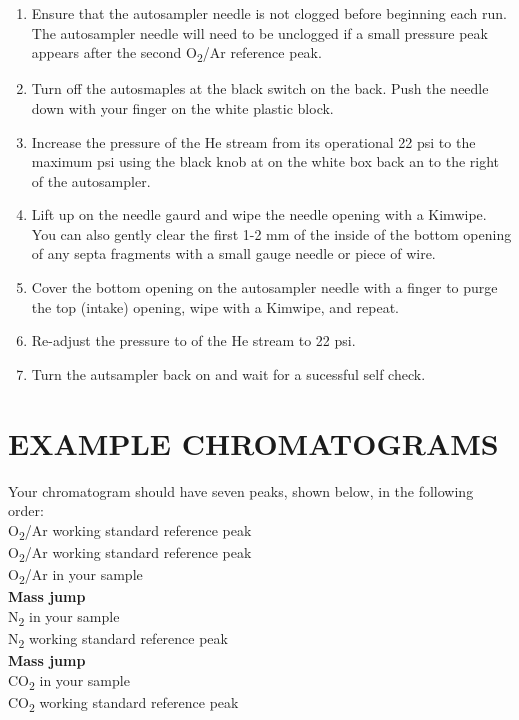 \documentclass[]{article}
\providecommand{\tightlist}{%
  \setlength{\itemsep}{0pt}\setlength{\parskip}{0pt}}
\begin{document}
\begin{enumerate}
\def\labelenumi{\arabic{enumi}.}
\tightlist
\item
  Ensure that the autosampler needle is not clogged before beginning
  each run. The autosampler needle will need to be unclogged if a small
  pressure peak appears after the second O\textsubscript{2}/Ar reference
  peak.\\
\item
  Turn off the autosmaples at the black switch on the back. Push the
  needle down with your finger on the white plastic block.\\
\item
  Increase the pressure of the He stream from its operational 22 psi to
  the maximum psi using the black knob at on the white box back an to
  the right of the autosampler.\\
\item
  Lift up on the needle gaurd and wipe the needle opening with a
  Kimwipe. You can also gently clear the first 1-2 mm of the inside of
  the bottom opening of any septa fragments with a small gauge needle or
  piece of wire.\\
\item
  Cover the bottom opening on the autosampler needle with a finger to
  purge the top (intake) opening, wipe with a Kimwipe, and repeat.\\
\item
  Re-adjust the pressure to of the He stream to 22 psi.\\
\item
  Turn the autsampler back on and wait for a sucessful self check.
\end{enumerate}

\section{EXAMPLE CHROMATOGRAMS}\label{example-chromatograms}

Your chromatogram should have seven peaks, shown below, in the following
order:\\
O\textsubscript{2}/Ar working standard reference peak\\
O\textsubscript{2}/Ar working standard reference peak\\
O\textsubscript{2}/Ar in your sample\\
\textbf{Mass jump}\\
N\textsubscript{2} in your sample\\
N\textsubscript{2} working standard reference peak\\
\textbf{Mass jump}\\
CO\textsubscript{2} in your sample\\
CO\textsubscript{2} working standard reference peak
\end{document}
